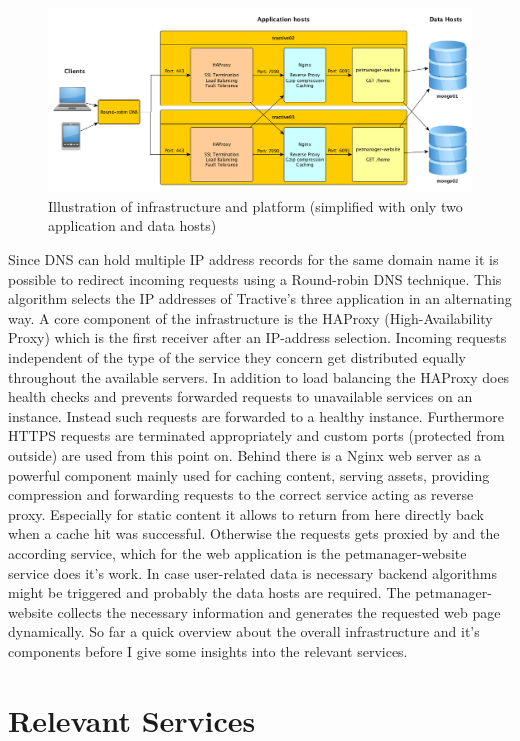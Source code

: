\begin{figure}[h]
	\centering
		\includegraphics[width=1.0\textwidth]{imgs/architecture.png}
	\caption{Illustration of infrastructure and platform (simplified with only two application and data hosts)}
\end{figure}

Since DNS can hold multiple IP address records for the same domain name it is possible to redirect incoming requests using a Round-robin DNS technique. This algorithm selects the IP addresses of Tractive's three application in an alternating way. A core component of the infrastructure is the HAProxy (High-Availability Proxy) which is the first receiver after an IP-address selection. Incoming requests independent of the type of the service they concern get distributed equally throughout the available servers. In addition to load balancing the HAProxy does health checks and prevents forwarded requests to unavailable services on an instance. Instead such requests are forwarded to a healthy instance. Furthermore HTTPS requests are terminated appropriately and custom ports (protected from outside) are used from this point on. Behind there is a Nginx web server as a powerful component mainly used for caching content, serving assets, providing compression and forwarding requests to the correct service acting as reverse proxy. Especially for static content it allows to return from here directly back when a cache hit was successful. Otherwise the requests gets proxied by and the according service, which for the web application is the petmanager-website service does it's work. In case user-related data is necessary backend algorithms might be triggered and probably the data hosts are required. The petmanager-website collects the necessary information and generates the requested web page dynamically. 
So far a quick overview about the overall infrastructure and it's components before I give some insights into the relevant services. 

\section{Relevant Services}
